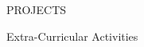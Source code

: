 \documentclass{resume}
\begin{document}
\begin{rSection}{PROJECTS}
	\vspace{-1.25em}
\end{rSection}

\begin{rSection}{Extra-Curricular Activities}
	\begin{itemize}
	\end{itemize}
\end{rSection}
\end{document}
